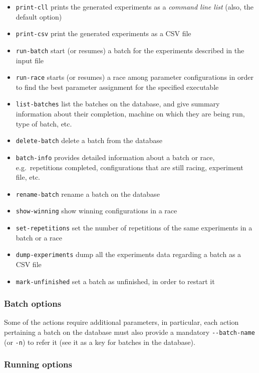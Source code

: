 \documentclass[11pt,notitlepage,twoside,a4paper]{article}
\begin{document}
\begin{itemize}
\item
  \texttt{print-cll} prints the generated experiments as a \emph{command
  line list} (also, the default option)
\item
  \texttt{print-csv} print the generated experiments as a CSV file
\item
  \texttt{run-batch} start (or resumes) a batch for the experiments
  described in the input file
\item
  \texttt{run-race} starts (or resumes) a race among parameter
  configurations in order to find the best parameter assignment for the
  specified executable
\item
  \texttt{list-batches} list the batches on the database, and give
  summary information about their completion, machine on which they are
  being run, type of batch, etc.
\item
  \texttt{delete-batch} delete a batch from the database
\item
  \texttt{batch-info} provides detailed information about a batch or
  race, e.g.~repetitions completed, configurations that are still
  racing, experiment file, etc.
\item
  \texttt{rename-batch} rename a batch on the database
\item
  \texttt{show-winning} show winning configurations in a race
\item
  \texttt{set-repetitions} set the number of repetitions of the same
  experiments in a batch or a race
\item
  \texttt{dump-experiments} dump all the experiments data regarding a
  batch as a CSV file
\item
  \texttt{mark-unfinished} set a batch as unfinished, in order to
  restart it
\end{itemize}

\subsubsection{Batch options}

Some of the actions require additional parameters, in particular, each
action pertaining a batch on the database must also provide a mandatory
\texttt{-{}-batch-name} (or \texttt{-n}) to refer it (see it as a key
for batches in the database).

\subsubsection{Running options}
\end{document}
